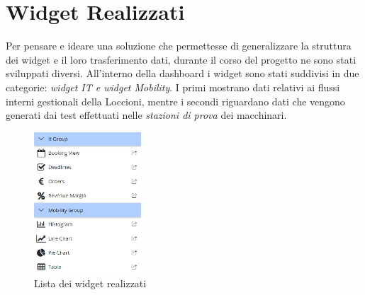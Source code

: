 \section{Widget Realizzati}
\label{chap:widget}
Per pensare e ideare una soluzione che permettesse di generalizzare la struttura dei widget e il loro trasferimento dati, durante il corso del progetto ne sono stati sviluppati diversi. All'interno della dashboard i widget sono stati suddivisi in due categorie: \textit{widget IT e widget Mobility}.
I primi mostrano dati relativi ai flussi interni gestionali della Loccioni, mentre i secondi riguardano dati che vengono generati dai test effettuati nelle \textit{stazioni di prova} dei macchinari.

\begin{figure}[ht]
\begin{center}
  \includegraphics[width=4cm]{images/lista_widget.png}
  \caption{Lista dei widget realizzati}\label{fig:git}
\end{center}
\end{figure}
\FloatBarrier

